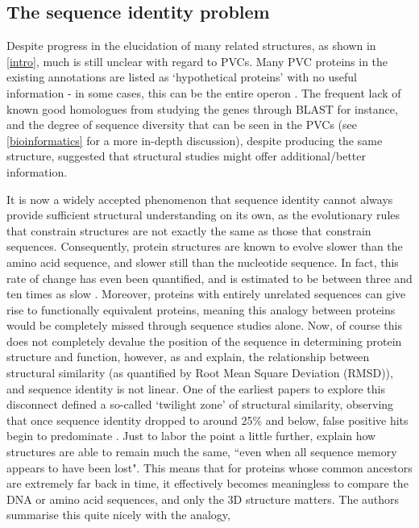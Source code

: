 \subsection{The sequence identity problem}
Despite progress in the elucidation of many related structures, as shown in \vref{intro}, much is still unclear with regard to PVCs. Many PVC proteins in the existing \Pa{} annotations are listed as `hypothetical proteins' with no useful information - in some cases, this can be the entire operon \citep{Duchaud2003}. The frequent lack of known good homologues from studying the genes through BLAST for instance, and the degree of sequence diversity that can be seen in the PVCs (see \vref{bioinformatics} for a more in-depth discussion), despite producing the same structure, suggested that structural studies might offer additional/better information.

It is now a widely accepted phenomenon that sequence identity cannot always provide sufficient structural understanding on its own, as the evolutionary rules that constrain structures are not exactly the same as those that constrain sequences. Consequently, protein structures are known to evolve slower than the amino acid sequence, and slower still than the nucleotide sequence. In fact, this rate of change has even been quantified, and is estimated to be between three and ten times as slow \citep{Illergard2009}. Moreover, proteins with entirely unrelated sequences can give rise to functionally equivalent proteins, meaning this analogy between proteins would be completely missed through sequence studies alone. Now, of course this does not completely devalue the position of the sequence in determining protein structure and function, however, as \cite{Illergard2009} and \cite{Chothia1986} explain, the relationship between structural similarity (as quantified by Root Mean Square Deviation (RMSD)), and sequence identity is not linear. One of the earliest papers to explore this disconnect defined a so-called `twilight zone' of structural similarity, observing that once sequence identity dropped to around 25\% and below, false positive hits begin to predominate \citep{rost1999twilight}. Just to labor the point a little further, \cite{Holm1996} explain how structures are able to remain much the same, ``even when all sequence memory appears
to have been lost". This means that for proteins whose common ancestors are extremely far back in time, it effectively becomes meaningless to compare the DNA or amino acid sequences, and only the 3D structure matters. The authors summarise this quite nicely with the analogy, 

